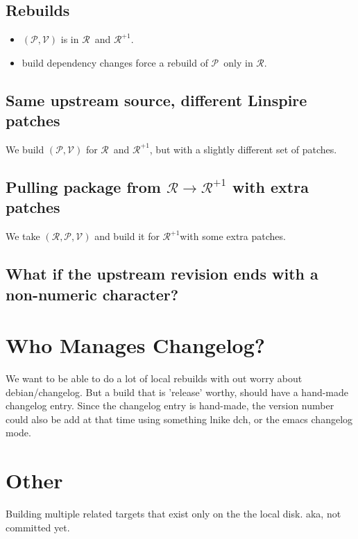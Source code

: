 \documentclass[11pt]{article}
\newcommand{\release}{\ensuremath{\mathcal{R}}}
\newcommand{\nextrelease}{\ensuremath{\mathcal{R}^{+1}}}
\newcommand{\version}{\ensuremath{\mathcal{V}}}
\newcommand{\package}{\ensuremath{\mathcal{P}}}
\begin{document}
\subsection{Rebuilds}

\begin{itemize}
\item $(\package, \version)$ is in \release\ and \nextrelease.
\item build dependency changes force a rebuild of \package\ only in \release.
\end{itemize}

\subsection{Same upstream source, different Linspire patches}

We build $(\package,\version)$ for \release\ and \nextrelease, but with a
slightly different set of patches.

\subsection{Pulling package from $\release \rightarrow \nextrelease$ with extra patches}

We take $(\release,\package,\version)$ and build it for \nextrelease with
some extra patches.

\subsection{What if the upstream revision ends with a non-numeric character?}

\section{Who Manages Changelog?}

We want to be able to do a lot of local rebuilds with out worry about
debian/changelog. But a build that is 'release' worthy, should have a
hand-made changelog entry. Since the changelog entry is hand-made, the
version number could also be add at that time using something lnike
dch, or the emacs changelog mode.

\section{Other}

Building multiple related targets that exist only on the the local
disk. aka, not committed yet.
\end{document}
